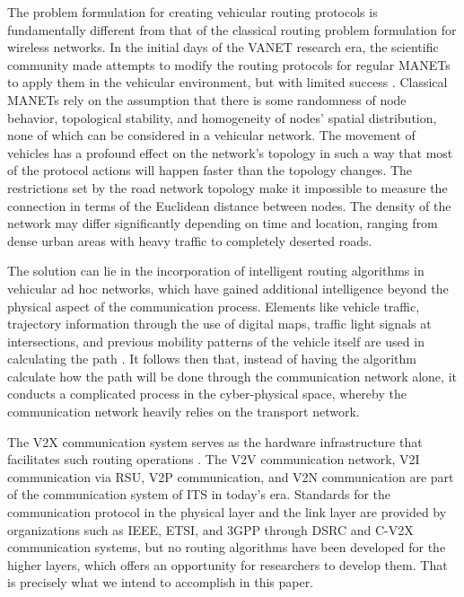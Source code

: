 \documentclass[12pt]{article}
\begin{document}
 

The problem formulation for creating vehicular routing protocols is fundamentally different from that of the classical routing problem formulation for wireless networks. In the initial days of the VANET research era, the scientific community made attempts to modify the routing protocols for regular MANETs to apply them in the vehicular environment, but with limited success \cite{sommer2008progressing}. Classical MANETs rely on the assumption that there is some randomness of node behavior, topological stability, and homogeneity of nodes' spatial distribution, none of which can be considered in a vehicular network. The movement of vehicles has a profound effect on the network's topology in such a way that most of the protocol actions will happen faster than the topology changes. The restrictions set by the road network topology make it impossible to measure the connection in terms of the Euclidean distance between nodes. The density of the network may differ significantly depending on time and location, ranging from dense urban areas with heavy traffic to completely deserted roads.

The solution can lie in the incorporation of intelligent routing algorithms in vehicular ad hoc networks, which have gained additional intelligence beyond the physical aspect of the communication process. Elements like vehicle traffic, trajectory information through the use of digital maps, traffic light signals at intersections, and previous mobility patterns of the vehicle itself are used in calculating the path \cite{boukerche2011routing}. It follows then that, instead of having the algorithm calculate how the path will be done through the communication network alone, it conducts a complicated process in the cyber-physical space, whereby the communication network heavily relies on the transport network.

The V2X communication system serves as the hardware infrastructure that facilitates such routing operations \cite{zheng2015heterogeneous}. The V2V communication network, V2I communication via RSU, V2P communication, and V2N communication are part of the communication system of ITS in today's era. Standards for the communication protocol in the physical layer and the link layer are provided by organizations such as IEEE, ETSI, and 3GPP through DSRC and C-V2X communication systems, but no routing algorithms have been developed for the higher layers, which offers an opportunity for researchers to develop them. That is precisely what we intend to accomplish in this paper.
\end{document}
